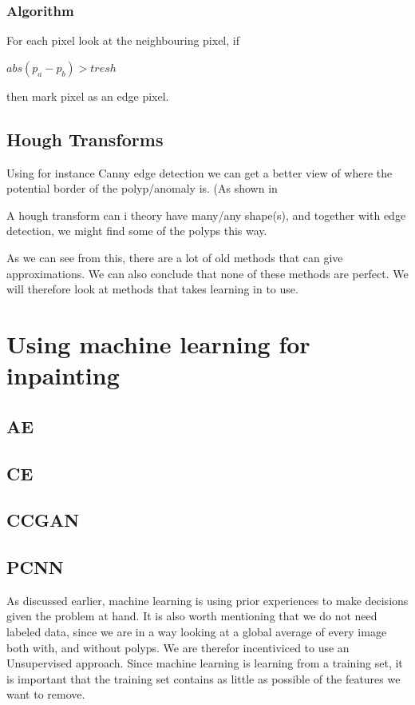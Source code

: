 	    \subsubsection{Algorithm}
	      For each pixel look at the neighbouring pixel, if \\
	      
	      \begin{centering} 
		$ abs(p_a - p_b)>tresh $\\ 
	      \end{centering}
	      
	      then mark pixel as an edge pixel. \\
	      
	  \subsection{Hough Transforms}
	    Using for instance Canny edge detection %
	    we can get a better view of where the potential border of the polyp/anomaly is. (As shown in %
	    
	    A hough transform can i theory have many/any shape(s), and together with edge detection, we might find some of the polyps this way.
	    
    
    
    
    
    
	
    As we can see from this, there are a lot of old methods that can give approximations. We can also conclude that none of these methods are perfect.
    We will therefore look at methods that takes learning in to use.
\section{Using machine learning for inpainting}
    \subsection{AE}
    \subsection{CE}
    \subsection{CCGAN}
    \subsection{PCNN}
    As discussed earlier, machine learning is using prior experiences to make decisions given the problem at hand. 
    It is also worth mentioning that we do not need labeled data, since we are in a way looking at a global average of every image both with, and without polyps. We are therefor incentiviced to use an 
    Unsupervised approach.
    Since machine learning is learning from a training set, it is important that the training set contains as little as possible of the features we want to remove. \\
    
